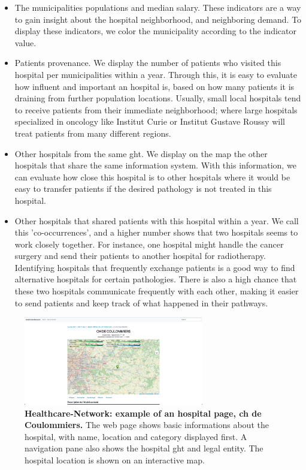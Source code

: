 \begin{itemize}
    \item The municipalities populations and median salary. These indicators are
          a way to gain insight about the hospital neighborhood, and neighboring
          demand. To display these indicators, we color the municipality according
          to the indicator value.
    \item Patients provenance. We display the number of patients who visited
          this hospital per municipalities within a year. Through this, it is
          easy to evaluate how influent and important an hospital is, based on
          how many patients it is draining from further population locations.
          Usually, small local hospitals tend to receive patients from their
          immediate neighborhood; where large hospitals specialized in oncology
          like Institut Curie or Institut Gustave Roussy will treat patients
          from many different regions.
    \item Other hospitals from the same \ac{ght}. We display on the map the other
          hospitals that share the same information system. With this information,
          we can evaluate how close this hospital is to other hospitals where it
          would be easy to transfer patients if the desired pathology is not treated
          in this hospital.
    \item Other hospitals that shared patients with this hospital within a year.
          We call this 'co-occurrences', and a higher number shows that two
          hospitals seems to work closely together. For instance, one hospital
          might handle the cancer surgery and send their patients to another
          hospital for radiotherapy. Identifying hospitals that frequently
          exchange patients is a good way to find alternative hospitals for
          certain pathologies. There is also a high chance that these two
          hospitals communicate frequently with each other, making it easier
          to send patients and keep track of what happened in their pathways.
\end{itemize}

\begin{figure}[h]
    \includegraphics[width=0.7\textwidth]{images/healthcare-network/hospital-page.png}
    \centering
    \caption{ \textbf{Healthcare-Network: example of an hospital page, \acf{ch}
            de Coulommiers.} The web page shows basic informations about the
        hospital, with name, location and category displayed first. A navigation
        pane also shows the hospital \ac{ght} and legal entity. The hospital
        location is shown on an interactive map. }
    \label{fig:hn-coulommiers-page}
\end{figure}

